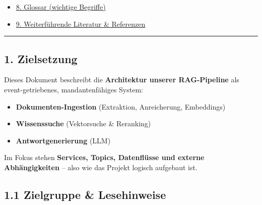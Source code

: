 \begin{itemize}
  \begin{itemize}
  \tightlist
  \item
    \hyperref[71-wie-wir-topics-verstehen]{7.1 Wie wir Topics verstehen}
  \item
    \hyperref[72-ablauf-bei-multi-upload-viele-dokumente-auf-einmal]{7.2
    Ablauf bei Multi-Upload}
  \item
    \hyperref[73-retry-mechanismen--fehlerbehandlung]{7.3
    Retry-Mechanismen \& Fehlerbehandlung}
  \item
    \hyperref[74-typische-bottlenecks-pro-stage]{7.4 Typische
    Bottlenecks pro Stage}
  \item
    \hyperref[75-zusammenspiel-mit-kubernetes]{7.5 Zusammenspiel mit
    Kubernetes}
  \item
    \hyperref[76-fehlerszenarien--reprocessing-strategien]{7.6
    Fehlerszenarien \& Reprocessing-Strategien}
  \end{itemize}
\item
  \hyperref[8-glossar-wichtige-begriffe]{8. Glossar (wichtige Begriffe)}
\item
  \hyperref[9-weiterfuxfchrende-literatur--referenzen]{9. Weiterführende
  Literatur \& Referenzen}
\end{itemize}

\begin{center}\rule{0.5\linewidth}{0.5pt}\end{center}

\subsection{1. Zielsetzung}\label{zielsetzung}

Dieses Dokument beschreibt die \textbf{Architektur unserer RAG-Pipeline}
als event-getriebenes, mandantenfähiges System:

\begin{itemize}
\tightlist
\item
  \textbf{Dokumenten-Ingestion} (Extraktion, Anreicherung, Embeddings)
\item
  \textbf{Wissenssuche} (Vektorsuche \& Reranking)
\item
  \textbf{Antwortgenerierung} (LLM)
\end{itemize}

Im Fokus stehen \textbf{Services, Topics, Datenflüsse und externe
Abhängigkeiten} -- also wie das Projekt logisch aufgebaut ist.

\subsection{1.1 Zielgruppe \&
Lesehinweise}\label{zielgruppe-lesehinweise}

